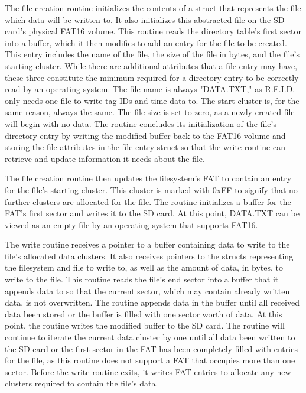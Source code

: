 The file creation routine initializes the contents of a struct that represents the file which data will be written to. It also initializes this abstracted file on the SD card's physical FAT16 volume. This routine reads the directory table's first sector into a buffer, which it then modifies to add an entry for the file to be created. This entry includes the name of the file, the size of the file in bytes, and the file's starting cluster. While there are additional attributes that a file entry may have, these three constitute the minimum required for a directory entry to be correctly read by an operating system. The file name is always "DATA.TXT," as R.F.I.D. only needs one file to write tag IDs and time data to. The start cluster is, for the same reason, always the same. The file size is set to zero, as a newly created file will begin with no data. The routine concludes its initialization of the file's directory entry by writing the modified buffer back to the FAT16 volume and storing the file attributes in the file entry struct so that the write routine can retrieve and update information it needs about the file.

The file creation routine then updates the filesystem's FAT to contain an entry for the file's starting cluster. This cluster is marked with 0xFF to signify that no further clusters are allocated for the file. The routine initializes a buffer for the FAT's first sector and writes it to the SD card. At this point, DATA.TXT can be viewed as an empty file by an operating system that supports FAT16.

The write routine receives a pointer to a buffer containing data to write to the file's allocated data clusters. It also receives pointers to the structs representing the filesystem and file to write to, as well as the amount of data, in bytes, to write to the file. This routine reads the file's end sector into a buffer that it appends data to so that the current sector, which may contain already written data, is not overwritten. The routine appends data in the buffer until all received data \DIFdelbegin {}\DIFdelend \DIFaddbegin {}\DIFaddend been stored or the buffer is filled with one sector worth of data. At this point, the routine writes the modified buffer to the SD card. The routine will continue to iterate the current data cluster by one until all data \DIFdelbegin {}\DIFdelend \DIFaddbegin {}\DIFaddend been written to the SD card or the first sector in the FAT has been completely filled with entries for the file, as this routine does not support a FAT that occupies more than one sector. Before the write routine exits, it writes FAT entries to allocate any new clusters required to contain the file's data. 





